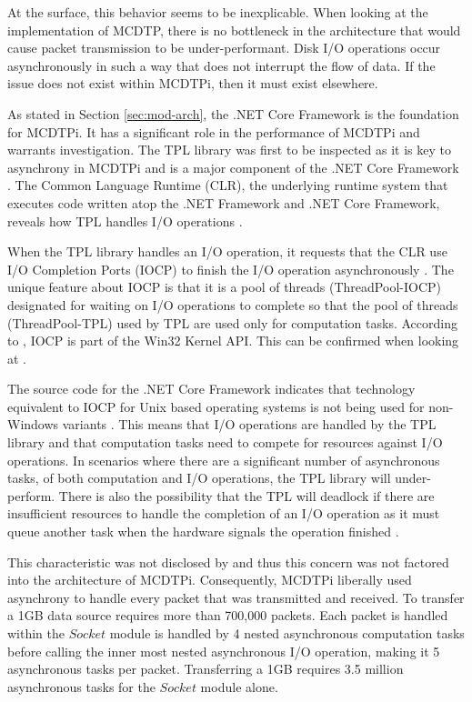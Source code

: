 At the surface, this behavior seems to be inexplicable. When looking at the implementation of MCDTP, there is no bottleneck in the architecture that would cause packet transmission to be under-performant. Disk I/O operations occur asynchronously in such a way that does not interrupt the flow of data. If the issue does not exist within MCDTPi, then it must exist elsewhere.

As stated in Section \ref{sec:mod-arch}, the .NET Core Framework is the foundation for MCDTPi. It has a significant role in the performance of MCDTPi and warrants investigation. The TPL library was first to be inspected as it is key to asynchrony in MCDTPi and is a major component of the .NET Core Framework \cite{Leijen2009}\cite{netCore103Src}. The Common Language Runtime (CLR), the underlying runtime system that executes code written atop the .NET Framework and .NET Core Framework, reveals how TPL handles I/O operations \cite{richter2012clr}.

When the TPL library handles an I/O operation, it requests that the CLR use I/O Completion Ports (IOCP) to finish the I/O operation asynchronously \cite{richter2012clr}. The unique feature about IOCP is that it is a pool of threads (ThreadPool-IOCP) designated for waiting on I/O operations to complete so that the pool of threads (ThreadPool-TPL) used by TPL are used only for computation tasks. According to \cite{richter2012clr}, IOCP is part of the Win32 Kernel API. This can be confirmed when looking at \cite{netCore103Src}.

The source code for the .NET Core Framework indicates that technology equivalent to IOCP for Unix based operating systems is not being used for non-Windows variants \cite{netCore103Src}. This means that I/O operations are handled by the TPL library and that computation tasks need to compete for resources against I/O operations. In scenarios where there are a significant number of asynchronous tasks, of both computation and I/O operations, the TPL library will under-perform. There is also the possibility that the TPL will deadlock if there are insufficient resources to handle the completion of an I/O operation as it must queue another task when the hardware signals the operation finished \cite{richter2012clr}.

This characteristic was not disclosed by \cite{netCore10}\cite{netCore103}\cite{netCore103Src} and thus this concern was not factored into the architecture of MCDTPi. Consequently, MCDTPi liberally used asynchrony to handle every packet that was transmitted and received. To transfer a 1GB data source requires more than 700,000 packets. Each packet is handled within the $Socket$ module is handled by 4 nested asynchronous computation tasks before calling the inner most nested asynchronous I/O operation, making it 5 asynchronous tasks per packet. Transferring a 1GB requires 3.5 million asynchronous tasks for the $Socket$ module alone.

